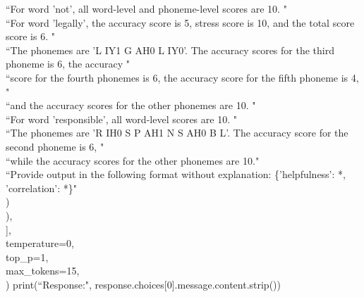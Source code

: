 \documentclass{Interspeech}
\begin{document}
\begin{algorithm}
\begin{algorithmic}[1]
    \STATE \hspace{20mm} ``For word 'not', all word-level and phoneme-level scores are 10. " \\
    \STATE \hspace{20mm} ``For word 'legally', the accuracy score is 5, stress score is 10, and the total score score is 6. " \\
    \STATE \hspace{20mm} ``The phonemes are 'L IY1 G AH0 L IY0'. The accuracy scores for the third phoneme is 6, the accuracy " \\
    \STATE \hspace{20mm} ``score for the fourth phonemes is 6, the accuracy score for the fifth phoneme is 4, " \\
    \STATE \hspace{20mm} ``and the accuracy scores for the other phonemes are 10. " \\
    \STATE \hspace{20mm} ``For word 'responsible', all word-level scores are 10. " \\
    \STATE \hspace{20mm} ``The phonemes are 'R IH0 S P AH1 N S AH0 B L'. The accuracy score for the second phoneme is 6, " \\
    \STATE \hspace{20mm} ``while the accuracy scores for the other phonemes are 10." \\
    \STATE \hspace{20mm} ``Provide output in the following format without explanation: \{'helpfulness': *, 'correlation': *\}" \\
    \STATE \hspace{15mm} ) \\
    \STATE \hspace{10mm} ), \\
    \STATE \hspace{5mm} ], \\
    \STATE \hspace{5mm} temperature=0, \\
    \STATE \hspace{5mm} top\_p=1, \\
    \STATE \hspace{5mm} max\_tokens=15, \\
    \STATE )
    \STATE print(``Response:", response.choices[0].message.content.strip())
  \end{algorithmic}
\end{algorithm}
\end{document}
